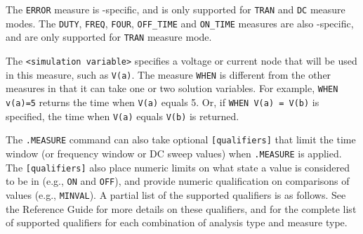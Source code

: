 The \texttt{ERROR} measure is \Xyce{}-specific, and is only supported for \texttt{TRAN} and
\texttt{DC} measure modes.  The \texttt{DUTY}, \texttt{FREQ}, \texttt{FOUR}, \texttt{OFF\_TIME}
and \texttt{ON\_TIME} measures are also \Xyce{}-specific, and are  only supported for
\texttt{TRAN} measure mode.

The \texttt{<simulation variable>} specifies a voltage or current node that
will be used in this measure, such as \texttt{V(a)}.  The measure \texttt{WHEN}
is different from the other measures in that it can take one or two solution
variables. For example, \texttt{WHEN v(a)=5} returns the time when
\texttt{V(a)} equals 5.  Or, if \texttt{WHEN V(a) = V(b)} is specified, the
time when \texttt{V(a)} equals \texttt{V(b)} is returned.

The \texttt{.MEASURE} command can also take optional \texttt{[qualifiers]} that
limit the time window (or frequency window or DC sweep values) when \texttt{.MEASURE} is 
applied. The \texttt{[qualifiers]} also place numeric limits on what state a value is
considered to be in (e.g., \texttt{ON} and \texttt{OFF}), and provide numeric
qualification on comparisons of values (e.g., \texttt{MINVAL}).  A partial list of the supported
qualifiers is as follows.  See the \Xyce{} Reference Guide\ReferenceGuide{} for more details
on these qualifiers, and for the complete list of supported qualifiers for each combination
of analysis type and measure type.

